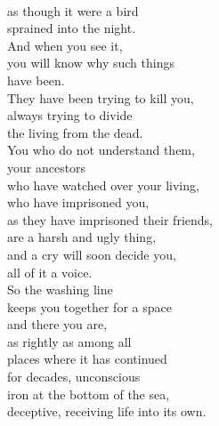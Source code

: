 \documentclass[smalldemyvopaper,11pt,twoside,onecolumn,openright,extrafontsizes]{memoir}
\begin{document}
\\as though it were a bird
\\sprained into the night.
\\And when you see it,
\\you will know why such things
\\have been.
\\They have been trying to kill you,
\\always trying to divide
\\the living from the dead.
\\You who do not understand them,
\\your ancestors
\\who have watched over your living,
\\who have imprisoned you,
\\as they have imprisoned their friends,
\\are a harsh and ugly thing,
\\and a cry will soon decide you,
\\all of it a voice.
\\So the washing line
\\keeps you together for a space
\\and there you are,
\\as rightly as among all
\\places where it has continued
\\for decades, unconscious
\\iron at the bottom of the sea,
\\deceptive, receiving life into its own.
\end{document}
